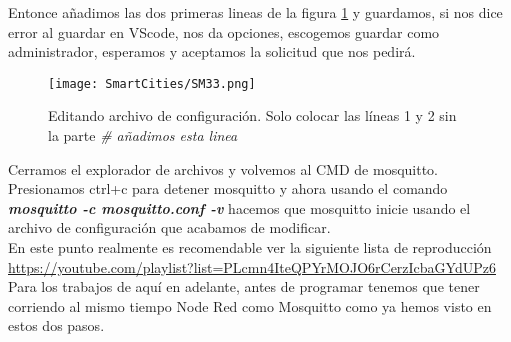 \documentclass[
	12pt, %
	fleqn, %
	a4paper, %
	oneside, %
]{LegrandOrangeBook}
\begin{document}
Entonce añadimos las dos primeras lineas de la figura \ref{fig:mosquittoconf} y guardamos, si nos dice error al guardar en VScode, nos da opciones, escogemos guardar como administrador, esperamos y aceptamos la solicitud que nos pedirá.
\begin{figure}[H]
\centering\texttt{[image: SmartCities/SM33.png]}
\caption{Editando archivo de configuración. Solo colocar las líneas 1 y 2 sin la parte \textit{\# añadimos esta linea}}
\label{fig:mosquittoconf}
\end{figure}
Cerramos el explorador de archivos y volvemos al CMD de mosquitto. Presionamos ctrl+c para detener mosquitto y ahora usando el comando \textbf{\textit{ mosquitto -c mosquitto.conf -v}} hacemos que mosquitto inicie usando el archivo de configuración que acabamos de modificar.\\
En este punto realmente es recomendable ver la siguiente lista de reproducción \url{https://youtube.com/playlist?list=PLcmn4IteQPYrMOJO6rCerzIcbaGYdUPz6}\\
Para los trabajos de aquí en adelante, antes de programar tenemos que tener corriendo al mismo tiempo Node Red como Mosquitto como ya hemos visto en estos dos pasos.
\end{document}
